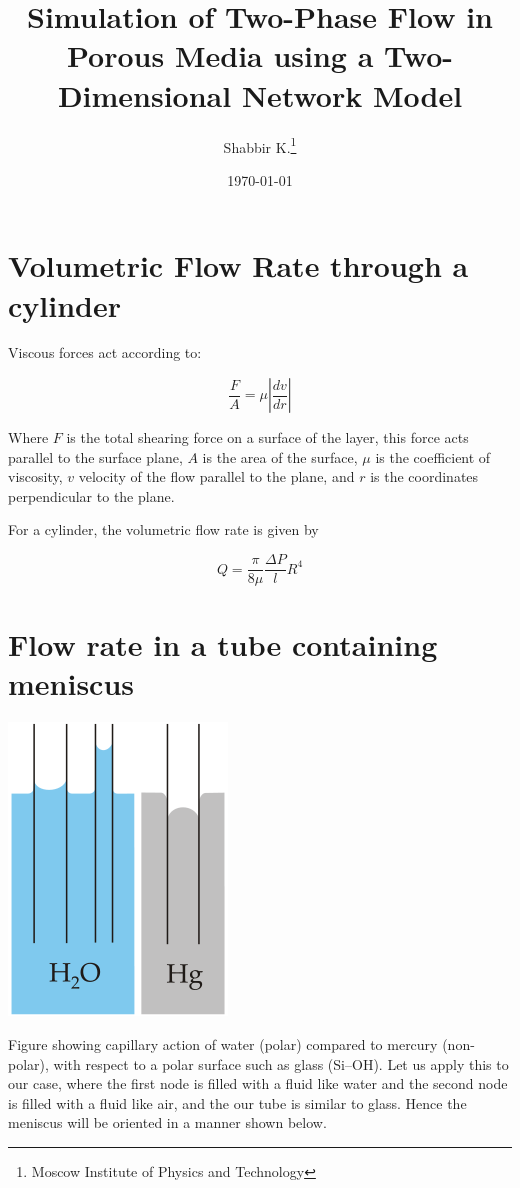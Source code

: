 \documentclass[12pt, a4paper]{article}
\title{Simulation of Two-Phase Flow in Porous Media using a Two-Dimensional Network Model}
\author{Shabbir K.\thanks{Moscow Institute of Physics and Technology}}
\date{\today}
\begin{document}
\maketitle

\section{Volumetric Flow Rate through a cylinder}

Viscous forces act according to:

\[ \frac{F}{A} = \mu \left| \frac{dv}{dr} \right| \]

Where $F$ is the total shearing force on a surface of the layer, this force acts parallel to the surface plane, $A$ is the area of the surface, $\mu$ is the coefficient of viscosity, $v$ velocity of the flow parallel to the plane, and $r$ is the coordinates perpendicular to the plane.

For a cylinder, the volumetric flow rate is given by

\begin{equation} \label{eq:flow-rate}
\boxed{Q = \frac{\pi}{8\mu}\frac{\Delta P}{l} R^4}
\end{equation}


\section{Flow rate in a tube containing meniscus}

\includegraphics{fig_capact-of-water} \label{fig_capact-of-water}

Figure showing capillary action of water (polar) compared to mercury (non-polar), with respect to a polar surface such as glass (Si–OH). Let us apply this to our case, where the first node is filled with a fluid like water and the second node is filled with a fluid like air, and the our tube is similar to glass. Hence the meniscus will be oriented in a manner shown below.
\end{document}

